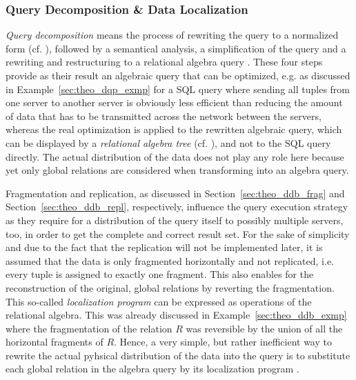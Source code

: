 \subsubsection{Query Decomposition \& Data Localization}
\label{sec:theo_dqp_decomp}

\emph{Query decomposition} means the process of rewriting the query to a normalized form (cf. \cite[p.~21,p.189f.]{Ozsu1991}), followed by a semantical
analysis, a simplification of the query and a rewriting and restructuring to a relational algebra query \cite[p.~183]{Ozsu1991}. These four steps provide
as their result an algebraic query that can be optimized, e.g. as discussed in Example~\ref{sec:theo_dqp_exmp} for a SQL query where sending all tuples
from one server to another server is obviously less efficient than reducing the amount of data that has to be transmitted across the network between the
servers, whereas the real optimization is applied to the rewritten algebraic query, which can be displayed by a \emph{relational algebra tree}
(cf. \cite[Figure~8.3, p.~195]{Ozsu1991}), and not to the SQL query directly. The actual distribution of the data does not play any role here because
yet only global relations are considered when transforming into an algebra query.

Fragmentation and replication, as discussed in Section~\ref{sec:theo_ddb_frag} and Section~\ref{sec:theo_ddb_repl}, respectively, influence the query
execution strategy as they require for a distribution of the query itself to possibly multiple servers, too, in order to get the complete and correct 
result set. For the sake of simplicity and due to the fact that the replication will not be implemented later, it is assumed that the data is only 
fragmented horizontally and not replicated, i.e. every tuple is assigned to exactly one fragment. This also enables for the reconstruction of the original,
global relations by reverting the fragmentation. This so-called \emph{localization program} \cite[p.~199]{Ozsu1991} can be expressed as operations of the
relational algebra. This was already discussed in Example~\ref{sec:theo_ddb_exmp} where the fragmentation of the relation $R$ was reversible by the union 
of all the horizontal fragments of $R$. Hence, a very simple, but rather inefficient way to rewrite the actual pyhsical distribution of the data into the
query is to substitute each global relation in the algebra query by its localization program \cite[p.~199]{Ozsu1991}.

